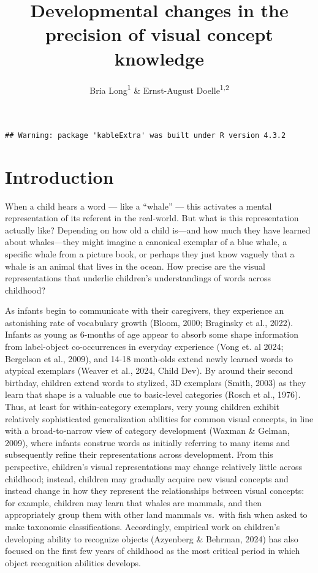 \documentclass[
  man]{apa6}
\title{Developmental changes in the precision of visual concept knowledge}
\author{Bria Long\textsuperscript{1} \& Ernst-August Doelle\textsuperscript{1,2}}
\date{}
\affiliation{\vspace{0.5cm}\textsuperscript{1} University of California San Diego\\\textsuperscript{2} Stanford University}
\begin{document}
\maketitle

\begin{verbatim}
## Warning: package 'kableExtra' was built under R version 4.3.2
\end{verbatim}

\section{Introduction}\label{introduction}

When a child hears a word --- like a ``whale'' --- this activates a mental representation of its referent in the real-world. But what is this representation actually like? Depending on how old a child is---and how much they have learned about whales---they might imagine a canonical exemplar of a blue whale, a specific whale from a picture book, or perhaps they just know vaguely that a whale is an animal that lives in the ocean. How precise are the visual representations that underlie children's understandings of words across childhood?

As infants begin to communicate with their caregivers, they experience an astonishing rate of vocabulary growth (Bloom, 2000; Braginsky et al., 2022). Infants as young as 6-months of age appear to absorb some shape information from label-object co-occurrences in everyday experience (Vong et. al 2024; Bergelson et al., 2009), and 14-18 month-olds extend newly learned words to atypical exemplars (Weaver et al., 2024, Child Dev). By around their second birthday, children extend words to stylized, 3D exemplars (Smith, 2003) as they learn that shape is a valuable cue to basic-level categories (Rosch et al., 1976). Thus, at least for within-category exemplars, very young children exhibit relatively sophisticated generalization abilities for common visual concepts, in line with a broad-to-narrow view of category development (Waxman \& Gelman, 2009), where infants construe words as initially referring to many items and subsequently refine their representations across development.
From this perspective, children's visual representations may change relatively little across childhood; instead, children may gradually acquire new visual concepts and instead change in how they represent the relationships between visual concepts: for example, children may learn that whales are mammals, and then appropriately group them with other land mammals vs.~with fish when asked to make taxonomic classifications. Accordingly, empirical work on children's developing ability to recognize objects (Azyenberg \& Behrman, 2024) has also focused on the first few years of childhood as the most critical period in which object recognition abilities develops.
\end{document}

